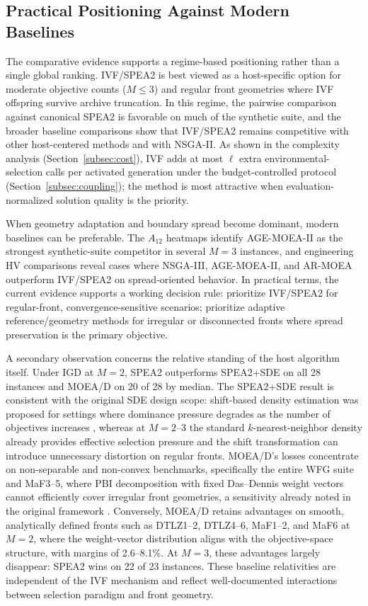 \documentclass[pdflatex,sn-mathphys-ay]{sn-jnl}%
\theoremstyle{thmstyleone}%
\theoremstyle{thmstyletwo}%
\theoremstyle{thmstylethree}%
\begin{document}
\subsection{Practical Positioning Against Modern Baselines}\label{subsec:discussion-positioning}
The comparative evidence supports a regime-based positioning rather than a single global ranking. IVF/SPEA2 is best viewed as a host-specific option for moderate objective counts ($M \le 3$) and regular front geometries where IVF offspring survive archive truncation. In this regime, the pairwise comparison against canonical SPEA2 is favorable on much of the synthetic suite, and the broader baseline comparisons show that IVF/SPEA2 remains competitive with other host-centered methods and with NSGA-II. As shown in the complexity analysis (Section~\ref{subsec:cost}), IVF adds at most $\ell$ extra environmental-selection calls per activated generation under the budget-controlled protocol (Section~\ref{subsec:coupling}); the method is most attractive when evaluation-normalized solution quality is the priority.

When geometry adaptation and boundary spread become dominant, modern baselines can be preferable. The $A_{12}$ heatmaps identify AGE-MOEA-II as the strongest synthetic-suite competitor in several $M=3$ instances, and engineering HV comparisons reveal cases where NSGA-III, AGE-MOEA-II, and AR-MOEA outperform IVF/SPEA2 on spread-oriented behavior. In practical terms, the current evidence supports a working decision rule: prioritize IVF/SPEA2 for regular-front, convergence-sensitive scenarios; prioritize adaptive reference/geometry methods for irregular or disconnected fronts where spread preservation is the primary objective.

A secondary observation concerns the relative standing of the host algorithm itself. Under IGD at $M=2$, SPEA2 outperforms SPEA2+SDE on all 28 instances and MOEA/D on 20 of 28 by median. The SPEA2+SDE result is consistent with the original SDE design scope: shift-based density estimation was proposed for settings where dominance pressure degrades as the number of objectives increases \citep{li2014shift}, whereas at $M=2$--$3$ the standard $k$-nearest-neighbor density already provides effective selection pressure and the shift transformation can introduce unnecessary distortion on regular fronts. MOEA/D's losses concentrate on non-separable and non-convex benchmarks, specifically the entire WFG suite and MaF3--5, where PBI decomposition with fixed Das--Dennis weight vectors cannot efficiently cover irregular front geometries, a sensitivity already noted in the original framework \citep{zhang2007moead}. Conversely, MOEA/D retains advantages on smooth, analytically defined fronts such as DTLZ1--2, DTLZ4--6, MaF1--2, and MaF6 at $M=2$, where the weight-vector distribution aligns with the objective-space structure, with margins of 2.6--8.1\%. At $M=3$, these advantages largely disappear: SPEA2 wins on 22 of 23 instances. These baseline relativities are independent of the IVF mechanism and reflect well-documented interactions between selection paradigm and front geometry.
\end{document}
